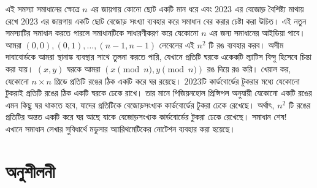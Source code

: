 \documentclass[11pt]{report}
\begin{document}
এই সমস্যা সমাধানের ক্ষেত্রে $n$ এর জায়গায় কোনো ছোট একটি মান ধরে এবং $2023$ এর বেজোড় বৈশিষ্ট্য মাথায় রেখে $2023$ এর জায়গায় একটি ছোট বেজোড় সংখ্যা ব্যবহার করে সমাধান বের করার চেষ্টা করা উচিত। এই নতুন সমস্যাটির সমাধান করতে পারলে সমাধানটিকে সাধারণীকরণ করে যেকোনো $n$ এর জন্য সমাধানের আইডিয়া পাবে।\\

আমরা $(0, 0), (0, 1), \ldots, (n-1, n-1)$ লেবেলের এই $n^2$ টি রঙ ব্যবহার করব। অসীম দাবাবোর্ডকে আমরা স্থানাঙ্ক ব্যবস্থার সাথে তুলনা করতে পারি, যেখানে প্রতিটি ঘরকে একেকটি ল্যাটিস বিন্দু হিসেবে চিন্তা করা যায়। $(x, y)$ ঘরকে আমরা $(x \pmod n, y \pmod n)$ রঙ দিয়ে রঙ করি। খেয়াল কর, যেকোনো $n \times n$ গ্রিডে প্রতিটি রঙের ঠিক একটি করে ঘর রয়েছে। $2023$টি কার্ডবোর্ডের টুকরার মধ্যে যেকোনো টুকরাই প্রতিটি রঙের ঠিক একটি ঘরকে ঢেকে রাখে। তার মানে পিজিয়নহোল প্রিন্সিপল অনুযায়ী যেকোনো একটি রঙের এমন কিছু ঘর থাকতে হবে, যাদের প্রতিটিকে বেজোড়সংখ্যক কার্ডবোর্ডের টুকরা ঢেকে রেখেছে। অর্থাৎ, $n^2$ টি রঙের প্রতিটির অন্তত একটি করে ঘর আছে যাকে বেজোড়সংখ্যক কার্ডবোর্ডের টুকরা ঢেকে রেখেছে। সমাধান শেষ!\\

এখানে সমাধান লেখার সুবিধার্থে মডুলার অ্যারিথমেটিকের নোটেশন ব্যবহার করা হয়েছে।

\newpage

\section{অনুশীলনী}
\end{document}
